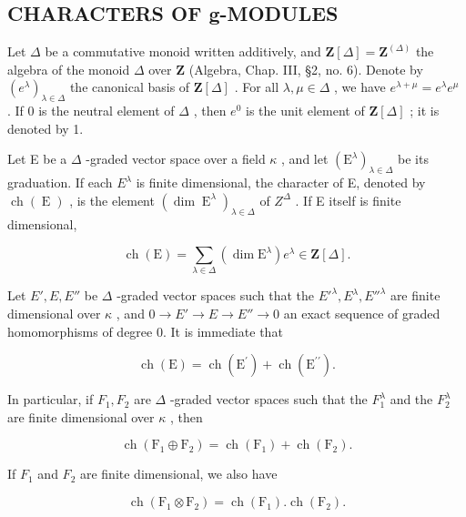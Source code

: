 \subsection{CHARACTERS OF g-MODULES}

Let \(\Delta\) be a commutative monoid written additively, and \(\mathbf{Z}[\Delta] = \mathbf{Z}^{(\Delta)}\) the algebra of the monoid \(\Delta\) over \(\mathbf{Z}\) (Algebra, Chap. III, §2, no. 6). Denote by \((e^{\lambda})_{\lambda \in \Delta}\) the canonical basis of \(\mathbf{Z}[\Delta]\) . For all \(\lambda, \mu \in \Delta\) , we have \(e^{\lambda + \mu} = e^{\lambda}e^{\mu}\) . If 0 is the neutral element of \(\Delta\) , then \(e^0\) is the unit element of \(\mathbf{Z}[\Delta]\) ; it is denoted by 1.

Let E be a \(\Delta\) -graded vector space over a field \(\kappa\) , and let \((\mathrm{E}^{\lambda})_{\lambda\in\Delta}\) be its graduation. If each \(E^{\lambda}\) is finite dimensional, the character of E, denoted by \(\operatorname{ch}(\operatorname{E})\) , is the element \((\dim\operatorname{E}^{\lambda})_{\lambda\in\Delta}\) of \(Z^{\Delta}\) . If E itself is finite dimensional,

\[
\operatorname{ch} (\mathrm{E}) = \sum_ {\lambda \in \Delta} (\dim \mathrm{E} ^ {\lambda}) e ^ {\lambda} \in \mathbf {Z} [ \Delta ].\tag{5}
\]

Let \(E', E, E''\) be \(\Delta\) -graded vector spaces such that the \(E'^{\lambda}, E^{\lambda}, E''^{\lambda}\) are finite dimensional over \(\kappa\) , and \(0 \longrightarrow E' \longrightarrow E \longrightarrow E'' \longrightarrow 0\) an exact sequence of graded homomorphisms of degree 0. It is immediate that

\[
\operatorname{ch} (\mathrm{E}) = \operatorname{ch} (\mathrm{E} ^ {\prime}) + \operatorname{ch} (\mathrm{E} ^ {\prime \prime}).\tag{6}
\]

In particular, if \(F_{1}, F_{2}\) are \(\Delta\) -graded vector spaces such that the \(F_{1}^{\lambda}\) and the \(F_{2}^{\lambda}\) are finite dimensional over \(\kappa\) , then

\[
\operatorname{ch} \left(\mathrm{F} _ {1} \oplus \mathrm{F} _ {2}\right) = \operatorname{ch} \left(\mathrm{F} _ {1}\right) + \operatorname{ch} \left(\mathrm{F} _ {2}\right).\tag{7}
\]

If \(F_{1}\) and \(F_{2}\) are finite dimensional, we also have

\[
\operatorname{ch} \left(\mathrm{F} _ {1} \otimes \mathrm{F} _ {2}\right) = \operatorname{ch} \left(\mathrm{F} _ {1}\right). \operatorname{ch} \left(\mathrm{F} _ {2}\right).\tag{8}
\]

